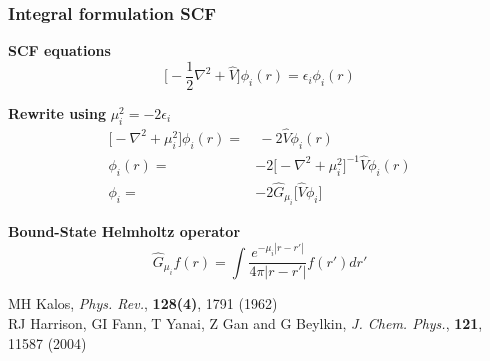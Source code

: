 \documentclass[mathserif, 10pt]{beamer}
\begin{document}
\begin{frame}
    \frametitle{Integral formulation SCF}
    \centering
    \textbf{SCF equations}
    \begin{equation}
	\nonumber
	\bigg[-\frac{1}{2}\nabla^2 + \hat{V}\bigg]\phi_i(r) = \epsilon_i \phi_i(r)
    \end{equation}

    \vspace{5mm}

    \textbf{Rewrite using} $\mu_i^2 = -2\epsilon_i$
    \begin{align}
	\nonumber
	\Big[-\nabla^2 + \mu_i^2\Big]\phi_i(r) =&\ -2\hat{V}\phi_i(r)\\
	\nonumber
	\phi_i(r) =&-2\Big[-\nabla^2 + \mu_i^2\Big]^{-1}\hat{V}\phi_i(r)\\
	\nonumber
	\phi_i =&-2\hat{G}_{\mu_i}\Big[\hat{V}\phi_i\Big]
    \end{align}

    \vspace{5mm}

    \textbf{Bound-State Helmholtz operator}
    \begin{equation}
	\nonumber
	\hat{G}_{\mu_i}f(r) = \int \frac{e^{-\mu_i |r-r'|}}{4\pi|r-r'|}f(r')dr'
    \end{equation}

    \vspace{5mm}

    \centering
    \tiny
    MH Kalos,
    {\it Phys. Rev.}, 
    \textbf{128(4)},
    1791 (1962)\\
    RJ Harrison, GI Fann, T Yanai, Z Gan and G Beylkin,
    {\it J. Chem. Phys.}, 
    \textbf{121},
    11587 (2004)
\end{frame}
\end{document}
